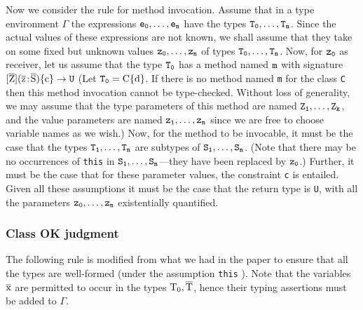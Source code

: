 \documentclass[preprint,nocopyrightspace,9pt]{sigplanconf}
\begin{document}
Now we consider the rule for method invocation. Assume that in a type
environment $\Gamma$ the expressions ${\tt e_0}, \dots, {\tt e_n}$
have the types ${\tt T_0}, \dots, {\tt T_n}$.
Since the
actual values of these expressions are not known, we shall assume that
they take on some fixed but unknown values
                                     ${\tt z_0}, \dots, {\tt z_n}$
of types ${\tt T_0}, \dots, {\tt T_n}$.
Now, for ${\tt z_0}$ as receiver, let us assume that the type
${\tt T_0}$ has a method named ${\tt m}$
with signature
$[\xbar{Z}](\xbar{z} \ty \xbar{S})\Xcd{\{c\}} \to {\tt U}$
(Let ${\tt T_0} = \Xcd{C\{d\}}$.
 If there is no
method named {\tt m} for the class {\tt C} then this method invocation cannot be
type-checked. Without loss of generality, we may assume that the
type parameters of this method are named
                                     ${\tt Z_1}, \dots, {\tt Z_k}$, and
the value parameters are named
                                     ${\tt z_1}, \dots, {\tt z_n}$
since we are free to choose
variable names as we wish.)
Now, for the method to be invocable,
it must be the case that the types
    ${\tt T_1}, \dots, {\tt T_n}$
are subtypes of
    ${\tt S_1}, \dots, {\tt S_n}$.
(Note
that there may be no occurrences of {\tt this} in
    ${\tt S_1}, \dots, {\tt S_n}$---they have been
replaced by ${\tt z_0}$.)
Further, it must be the case that for these parameter
values, the constraint {\tt c} is entailed. Given all these assumptions it
must be the case that the return type is {\tt U}, with all the parameters
    ${\tt z_0}, \dots, {\tt z_n}$
existentially quantified.


\subsubsection{
        Class OK judgment
}

The following rule is modified from what we had in the paper to ensure
that all the types are well-formed (under the assumption {\tt this} ).
Note
that the variables $\xbar{x}$ are permitted to occur in the types $\Xcd{T}_0, \xbar{T}$,
hence their typing assertions must be added to $\Gamma$.

\end{document}
